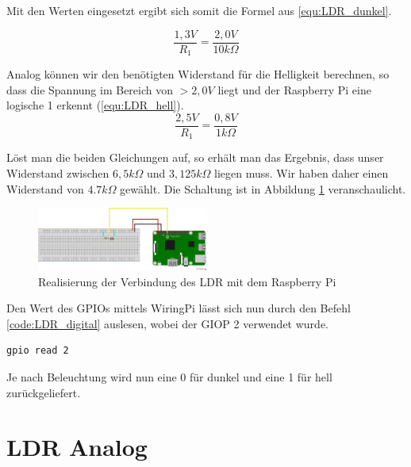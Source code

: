 Mit den Werten eingesetzt ergibt sich somit die Formel aus \ref{equ:LDR_dunkel}.

\begin{equation}
 \frac{1,3V}{R_1} = \frac{2,0V}{10k \Omega}
\label{equ:LDR_dunkel}
\end{equation}

Analog können wir den benötigten Widerstand für die Helligkeit berechnen, so dass die Spannung im Bereich von $> 2,0V$ liegt und der Raspberry Pi eine logische 1 erkennt (\ref{equ:LDR_hell}).
\begin{equation}
 \frac{2,5V}{R_1} = \frac{0,8V}{1k \Omega}
\label{equ:LDR_hell}
\end{equation}

Löst man die beiden Gleichungen auf, so erhält man das Ergebnis, dass unser Widerstand zwischen $6,5 k \Omega$ und $3,125 k \Omega$ liegen muss. Wir haben daher einen Widerstand von $4.7 k \Omega$ gewählt. Die Schaltung ist in Abbildung \ref{img:plan_1_4_3}  veranschaulicht.

\begin{figure}
	\centering
	\includegraphics[width=0.5\textwidth]{figures/Schaltplaene/Milestone1_4_3_Steckplatine.jpg}
	\caption{Realisierung der Verbindung des LDR mit dem Raspberry Pi}
	\label{img:plan_1_4_3}
\end{figure}

Den Wert des GPIOs mittels WiringPi lässt sich nun durch den Befehl \ref{code:LDR_digital} auslesen, wobei der GIOP 2 verwendet wurde.

\begin{lstlisting}[caption={Auslesen des GPIOs mittels WiringPi},label=code:LDR_digital]
gpio read 2
\end{lstlisting}

Je nach Beleuchtung wird nun eine 0 für dunkel und eine 1 für hell zurückgeliefert.



\section{LDR Analog}

